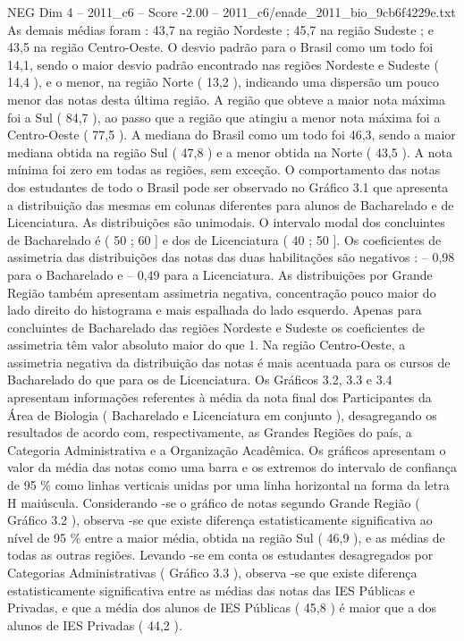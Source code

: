 \begin{textsample}{NEG Dim 4 – 2011\_c6 – Score -2.00 – 2011\_c6/enade\_2011\_bio\_9cb6f4229e.txt}
As demais médias foram : 43,7 na região Nordeste ; 45,7 na região Sudeste ; e 43,5 na região Centro-Oeste.
O desvio padrão para o Brasil como um todo foi 14,1, sendo o maior desvio padrão encontrado nas regiões Nordeste e Sudeste ( 14,4 ), e o menor, na região Norte ( 13,2 ), indicando uma dispersão um pouco menor das notas desta última região.
A região que obteve a maior nota máxima foi a Sul ( 84,7 ), ao passo que a região que atingiu a menor nota máxima foi a Centro-Oeste ( 77,5 ).
A mediana do Brasil como um todo foi 46,3, sendo a maior mediana obtida na região Sul ( 47,8 ) e a menor obtida na Norte ( 43,5 ).
A nota mínima foi zero em todas as regiões, sem exceção.
O comportamento das notas dos estudantes de todo o Brasil pode ser observado no Gráfico 3.1 que apresenta a distribuição das mesmas em colunas diferentes para alunos de Bacharelado e de Licenciatura.
As distribuições são unimodais.
O intervalo modal dos concluintes de Bacharelado é ( 50 ; 60 ] e dos de Licenciatura ( 40 ; 50 ].
Os coeficientes de assimetria das distribuições das notas das duas habilitações são negativos : – 0,98 para o Bacharelado e – 0,49 para a Licenciatura.
As distribuições por Grande Região também apresentam assimetria negativa, concentração pouco maior do lado direito do histograma e mais espalhada do lado esquerdo.
Apenas para concluintes de Bacharelado das regiões Nordeste e Sudeste os coeficientes de assimetria têm valor absoluto maior do que 1.
Na região Centro-Oeste, a assimetria negativa da distribuição das notas é mais acentuada para os cursos de Bacharelado do que para os de Licenciatura.
Os Gráficos 3.2, 3.3 e 3.4 apresentam informações referentes à média da nota final dos Participantes da Área de Biologia ( Bacharelado e Licenciatura em conjunto ), desagregando os resultados de acordo com, respectivamente, as Grandes Regiões do país, a Categoria Administrativa e a Organização Acadêmica.
Os gráficos apresentam o valor da média das notas como uma barra e os extremos do intervalo de confiança de 95 \% como linhas verticais unidas por uma linha horizontal na forma da letra H maiúscula.
Considerando -se o gráfico de notas segundo Grande Região ( Gráfico 3.2 ), observa -se que existe diferença estatisticamente significativa ao nível de 95 \% entre a maior média, obtida na região Sul ( 46,9 ), e as médias de todas as outras regiões.
Levando -se em conta os estudantes desagregados por Categorias Administrativas ( Gráfico 3.3 ), observa -se que existe diferença estatisticamente significativa entre as médias das notas das IES Públicas e Privadas, e que a média dos alunos de IES Públicas ( 45,8 ) é maior que a dos alunos de IES Privadas ( 44,2 ).

\end{textsample}
